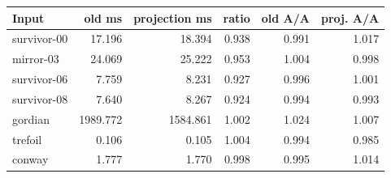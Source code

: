 \begin{center}\small
\begin{tabular}{@{}lrrrrr@{}}
\toprule
Input & old ms & projection ms & ratio & old A/A & proj. A/A \\
\midrule
survivor-00 & 17.196 & 18.394 & 0.938 & 0.991 & 1.017 \\
mirror-03 & 24.069 & 25.222 & 0.953 & 1.004 & 0.998 \\
survivor-06 & 7.759 & 8.231 & 0.927 & 0.996 & 1.001 \\
survivor-08 & 7.640 & 8.267 & 0.924 & 0.994 & 0.993 \\
gordian & 1989.772 & 1584.861 & 1.002 & 1.024 & 1.007 \\
trefoil & 0.106 & 0.105 & 1.004 & 0.994 & 0.985 \\
conway & 1.777 & 1.770 & 0.998 & 0.995 & 1.014 \\
\bottomrule
\end{tabular}
\end{center}
